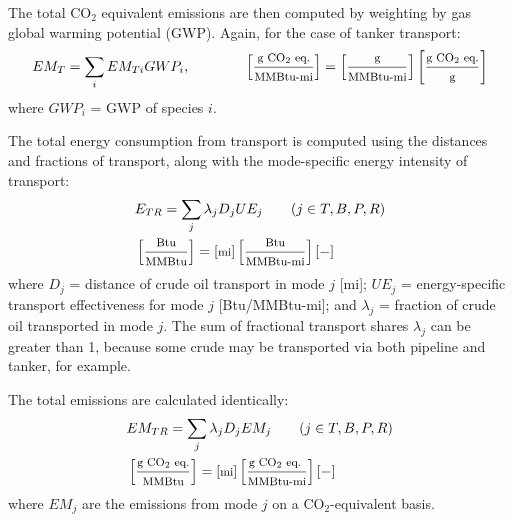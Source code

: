 \documentclass[11pt]{report}
\newcommand{\marg}[1]{{\footnotesize\textit{\textcolor{stanford}{'#1'}}}}
\newcommand{\marginnote}[1]{\marginpar{\marg{#1}}}
\begin{document}
{The total CO$_2$ equivalent emissions are then computed by weighting by gas global warming potential (GWP). Again, for the case of tanker transport: \marginnote{Crude \\ Transport \\ Table 2.4}
\begin{equation}\label{eq:trans_emtotk}
EM_{T} = \sum_i EM_{Ti} GWP_i, \quad \quad \quad \quad \begin{footnotesize} \left[ \frac{\text{g CO$_2$ eq.}}{\text{MMBtu-mi}} \right] = \left[ \frac{\text{g}}{\text{MMBtu-mi}} \right] \left[ \frac{\text{g CO$_2$ eq.}}{\text{g}} \right] \end{footnotesize}
\end{equation}
where $GWP_i$ = GWP of species $i$.

The total energy consumption from transport is computed using the distances and fractions of transport, along with the mode-specific energy intensity of transport: \marginnote{Crude \\ Transport \\ 3.1}
\begin{equation}\label{eq:trans_Etr}
\begin{split}
& E_{TR} = \sum_{j} \lambda_j D_{j} UE_{j} \quad\quad (j \in T,B,P,R) \\
& \begin{footnotesize} \left[ \frac{\text{Btu}}{\text{MMBtu}} \right] = \left[ \text{mi} \right] \left[ \frac{\text{Btu}}{\text{MMBtu-mi}} \right] [-] 
\end{footnotesize}
\end{split}
\end{equation}
where $D_j$ = distance of crude oil transport in mode $j$ [mi]; $UE_{j}$ = energy-specific transport effectiveness for mode $j$ [Btu/MMBtu-mi]; and $\lambda_j$ = fraction of crude oil transported in mode $j$. The sum of fractional transport shares $\lambda_{j}$ can be greater than 1, because some crude may be transported via both pipeline and tanker, for example.

The total emissions are calculated identically: \marginnote{Crude \\ Transport \\ 3.2}
\begin{equation}\label{eq:trans_Emtr}
\begin{split}
&EM_{TR} = \sum_{j} \lambda_j D_{j} EM_{j} \quad\quad (j \in T,B,P,R) \\
& \begin{footnotesize} \left[ \frac{\text{g CO$_2$ eq.}}{\text{MMBtu}} \right] = \left[ \text{mi} \right] \left[ \frac{\text{g CO$_2$ eq.\ }}{\text{MMBtu-mi}} \right] [-] \end{footnotesize}
\end{split}
\end{equation}
where $EM_{j}$ are the emissions from mode $j$ on a CO$_2$-equivalent basis.


}
\end{document}
